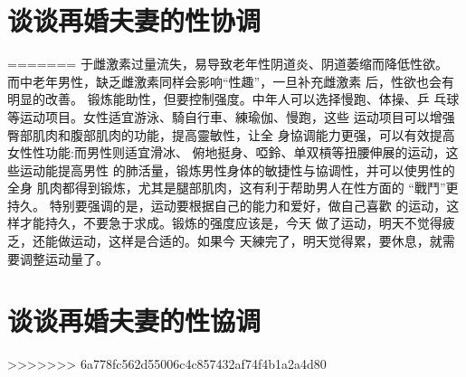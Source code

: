 \documentclass[12pt,UTF8]{ctexbook}
\begin{document}
\section{谈谈再婚夫妻的性协调}
=======
于雌激素过量流失，易导致老年性阴道炎、阴道萎缩而降低性欲。
而中老年男性，缺乏雌激素同样会影响“性趣”，一旦补充雌激素
后，性欲也会有明显的改善。
锻炼能助性，但要控制强度。中年人可以选择慢跑、体操、乒
乓球等运动项目。女性适宜游泳、騎自行車、練瑜伽、慢跑，这些
运动项目可以增强臀部肌肉和腹部肌肉的功能，提高靈敏性，让全
身協调能力更强，可以有效提高女性性功能:而男性则适宜滑冰、
俯地挺身、啞鈴、单双槓等扭腰伸展的运动，这些运动能提高男性
的肺活量，锻炼男性身体的敏捷性与協调性，并可以使男性的全身
肌肉都得到锻炼，尤其是腿部肌肉，这有利于帮助男人在性方面的
“戰鬥”更持久。
特别要强调的是，运动要根据自己的能力和爱好，做自己喜歡
的运动，这样才能持久，不要急于求成。锻炼的强度应该是，今天
做了运动，明天不觉得疲乏，还能做运动，这样是合适的。如果今
天練完了，明天觉得累，要休息，就需要调整运动量了。

\section{谈谈再婚夫妻的性協调}
>>>>>>> 6a778fc562d55006c4c857432af74f4b1a2a4d80
\end{document}
